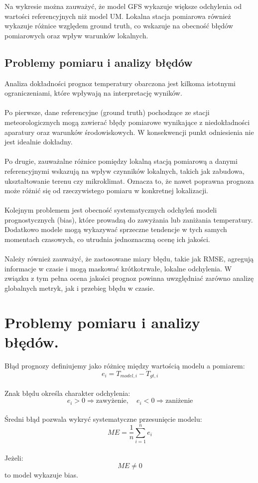 \documentclass[a4paper,12pt]{article}
\begin{document}
\noindent
Na wykresie można zauważyć, że model GFS wykazuje większe odchylenia od wartości referencyjnych niż model UM. Lokalna stacja pomiarowa również wykazuje różnice względem ground truth, co wskazuje na obecność błędów pomiarowych oraz wpływ warunków lokalnych.




\subsection{Problemy pomiaru i analizy błędów}

Analiza dokładności prognoz temperatury obarczona jest kilkoma istotnymi ograniczeniami, które wpływają na interpretację wyników.
\\
\\
\noindent
Po pierwsze, dane referencyjne (ground truth) pochodzące ze stacji meteorologicznych mogą zawierać błędy pomiarowe wynikające z niedokładności aparatury oraz warunków środowiskowych. W konsekwencji punkt odniesienia nie jest idealnie dokładny.
\\
\\
\noindent
Po drugie, zauważalne różnice pomiędzy lokalną stacją pomiarową a danymi referencyjnymi wskazują na wpływ czynników lokalnych, takich jak zabudowa, ukształtowanie terenu czy mikroklimat. Oznacza to, że nawet poprawna prognoza może różnić się od rzeczywistego pomiaru w konkretnej lokalizacji.
\\
\\
\noindent
Kolejnym problemem jest obecność systematycznych odchyleń modeli prognostycznych (bias), które prowadzą do zawyżania lub zaniżania temperatury. Dodatkowo modele mogą wykazywać sprzeczne tendencje w tych samych momentach czasowych, co utrudnia jednoznaczną ocenę ich jakości.
\\
\\
\noindent
Należy również zauważyć, że zastosowane miary błędu, takie jak RMSE, agregują informacje w czasie i mogą maskować krótkotrwałe, lokalne odchylenia. W związku z tym pełna ocena jakości prognoz powinna uwzględniać zarówno analizę globalnych metryk, jak i przebieg błędu w czasie.


\section{Problemy pomiaru i analizy błędów.}

Błąd prognozy definiujemy jako różnicę między wartością modelu a pomiarem:
\[
e_i = T_{model,i} - T_{gt,i}
\]
\\
\noindent
Znak błędu określa charakter odchylenia:
\[
e_i > 0 \Rightarrow \text{zawyżenie}, \quad
e_i < 0 \Rightarrow \text{zaniżenie}
\]
\\
\noindent
Średni błąd pozwala wykryć systematyczne przesunięcie modelu:
\[
ME = \frac{1}{n} \sum_{i=1}^{n} e_i
\]
\\
\noindent
Jeżeli:
\[
ME \neq 0
\]
to model wykazuje bias.
\\
\end{document}
